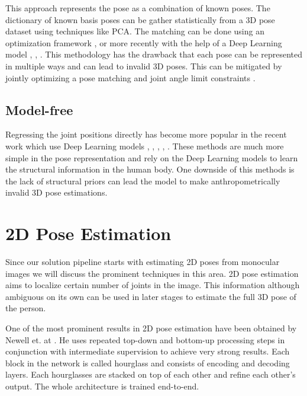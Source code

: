 This approach represents the pose as a combination of known poses. The dictionary of known basis poses can be gather statistically from a 3D pose dataset using techniques like PCA. The matching can be done using an optimization framework  \parencite{ramakrishna2012reconstructing}, \parencite{zhou20153d} or more recently with the help of a Deep Learning model \parencite{zhou2016sparseness}, \parencite{chen20173d}, \parencite{tome2017lifting}. This methodology has the drawback that each pose can be represented in multiple ways and can lead to invalid 3D poses. This can be mitigated by jointly optimizing a pose matching and joint angle limit constraints \parencite{akhter2015pose}.

\subsection{Model-free}

Regressing the joint positions directly has become more popular in the recent work which use Deep Learning models , \parencite{pavlakos2017coarse}, \parencite{martinez2017simple}, \parencite{hossain2017exploiting}, \parencite{tekin2017learning}. These methods are much more simple in the pose representation and rely on the Deep Learning models to learn the structural information in the human body. One downside of this methods is the lack of structural priors can lead the model to make anthropometrically invalid 3D pose estimations.

\section{2D Pose Estimation}

Since our solution pipeline starts with estimating 2D poses from monocular images we will discuss the prominent techniques in this area. 2D pose estimation aims to localize certain number of joints in the image. This information although ambiguous on its own can be used in later stages to estimate the full 3D pose of the person.

One of the most prominent results in 2D pose estimation have been obtained by Newell et. at \parencite{newell2016stacked}. He uses repeated top-down and bottom-up processing steps in conjunction with intermediate supervision to achieve very strong results. Each block in the network is called hourglass and consists of encoding and decoding layers. Each hourglasses are stacked on top of each other and refine each other's output. The whole architecture is trained end-to-end.

